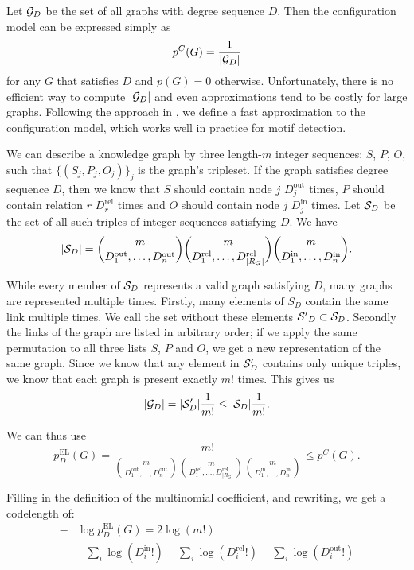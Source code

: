 \documentclass[letterpaper]{article} %
\newcommand{\G}{{\cal G}}
\begin{document}
Let $\G_D$ be the set of all graphs with degree sequence $D$. Then the configuration model can be expressed simply as
\[
p^C(G) = \frac{1}{|\G_D|}
\]
for any $G$ that satisfies $D$ and $p(G) = 0$ otherwise. Unfortunately, there is no efficient way to compute $|\G_D|$ and even approximations tend to be costly for large graphs. Following the approach in \cite{bloem2017large}, we define a fast approximation to the configuration model, which works well in practice for motif detection. 

We can describe a knowledge graph by three length-$m$ integer sequences: $S$, $P$, $O$, such that $\{(S_j, P_j, O_j)\}_j$ is the graph's tripleset. If the graph satisfies degree sequence $D$, then we know that $S$ should contain node $j$ $D^\text{out}_j$ times, $P$ should contain relation $r$ $D^\text{rel}_r$ times and $O$ should contain node $j$ $D^\text{in}_j$ times.  Let ${\cal S}_D$ be the set of all such triples of integer sequences satisfying $D$. We have 
\[
|{\cal S}_D| =
 {m \choose {D_1^\text{out}, \ldots, D_n^\text{out}} }
 {m \choose {D_1^\text{rel}, \ldots, D_{|R_G|}^\text{rel}} }
 {m \choose {D_1^\text{in}, \ldots, D_n^\text{in}} } \text{.}
\]

While every member of ${\cal S}_D$ represents a valid graph satisfying $D$, many graphs are represented multiple times. Firstly, many elements of ${S}_D$ contain the same link multiple times. We call the set without these elements ${\cal S'}_D \subset {\cal S}_D$. Secondly the links of the graph are listed in arbitrary order; if we apply the same permutation to all three lists $S$, $P$ and $O$, we get a new representation of the same graph. Since we know that any element in ${\cal S}'_D$ contains only unique triples, we know that each graph is present exactly $m!$ times. This gives us
\[
|\G_D| = |{\cal S}'_D| \frac{1}{m!} \leq  |{\cal S}_D| \frac{1}{m!} \text{.}
\]

We can thus use 
\[
p^\text{EL}_D(G) =  \frac{m!}{{m \choose {D_1^\text{out}, \ldots, D_n^\text{out}} }
 {m \choose {D_1^\text{rel}, \ldots, D_{|R_G|}^\text{rel}} }
 {m \choose {D_1^\text{in}, \ldots, D_n^\text{in}} }} \leq p^C(G) \text{.}
\]

Filling in the definition of the multinomial coefficient, and rewriting, we get a codelength of:
\begin{align*}
- &\log p^\text{EL}_D(G) = 2 \log(m!) \\
&- \sum_i \log(D_i^\text{in}!)- \sum_i \log(D_i^\text{rel}!)- \sum_i \log(D_i^\text{out}!)
\end{align*}
\end{document}
